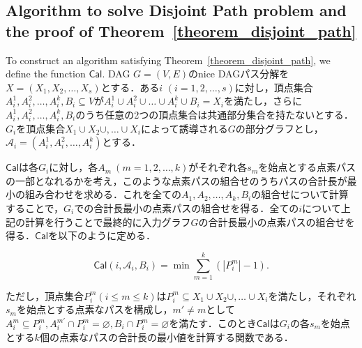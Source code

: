 




\subsection{Algorithm to solve Disjoint Path problem and the proof of Theorem~\ref{theorem_disjoint_path}}

To construct an algorithm satisfying Theorem~\ref{theorem_disjoint_path}, we define the function $\mathsf{Cal}$. DAG $G=(V, E)$のnice DAGパス分解を$X=(X_1, X_2, \dots , X_s)$とする．ある$i$ $(i=1, 2, \dots , s)$に対し，頂点集合$A^1_i, A^2_i, \dots , A^k_i, B_i \subseteq V$が$A^1_i \cup A^2_i \cup \dots \cup A^k_i \cup B_i = X_i$を満たし，さらに$A^1_i, A^2_i, \dots ,A^k_i, B_i$のうち任意の2つの頂点集合は共通部分集合を持たないとする．$G_i$を頂点集合$X_1 \cup X_2 \cup,  \dots \cup X_i$によって誘導される$G$の部分グラフとし，$\mathscr{A}_i=(A^1_i, A^2_i, \dots ,A^k_i)$とする．

$\mathsf{Cal}$は各$G_i$に対し，各$A_m\ (m=1, 2, \dots, k)$がそれぞれ各$s_m$を始点とする点素パスの一部となれるかを考え，このような点素パスの組合せのうちパスの合計長が最小の組み合わせを求める．これを全ての$A_1, A_2, \dots, A_k, B_i$の組合せについて計算することで，$G_i$での合計長最小の点素パスの組合せを得る．全ての$i$について上記の計算を行うことで最終的に入力グラフ$G$の合計長最小の点素パスの組合せを得る．$\mathsf{Cal}$を以下のように定める．

\begin{equation}\label{def_cal}
    \mathsf{Cal}(i, \mathscr{A}_i, B_i) = \min \sum_{m=1}^k (|P^m_i| - 1).
\end{equation}

ただし，頂点集合$P^m_i (i\leq m \leq k)$は$P^m_i \subseteq X_1 \cup X_2 \cup,  \dots \cup X_i$を満たし，それぞれ$s_m$を始点とする点素なパスを構成し，$m' \neq m$として$A^m_i \subseteq P^m_i, A^{m'}_i \cap P^m_i = \varnothing, B_i \cap P^m_i = \varnothing$を満たす．このとき$\mathsf{Cal}$は$G_i$の各$s_m$を始点とする$k$個の点素なパスの合計長の最小値を計算する関数である．



